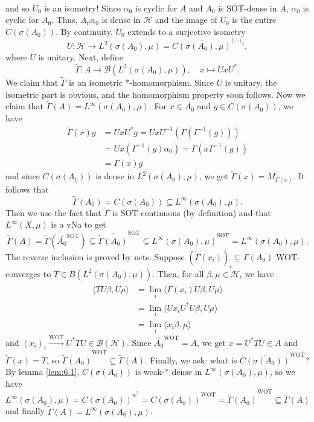 \begin{myproof}
\begin{align*}
  \end{align*}
  and so $U_0$ is an isometry! Since $\alpha_0$ is cyclic for $A$ and $A_0$ is SOT-dense in $A$, $\alpha_0$ is cyclic for $A_0$. Thus, $A_0 \alpha_0$ is dense in $\mathcal{H}$ and the image of $U_0$ is the entire $C(\sigma(A_0))$. By continuity, $U_0$ extends to a surjective isometry 
  $$ U : \mathcal{H} \to L^2 (\sigma(A_0), \mu) = \overline{C(\sigma(A_0), \mu)}^{\langle \cdot, \cdot \rangle_2}, $$
  where $U$ is unitary. Next, define 
  $$ \widetilde{\Gamma} : A \to \mathcal{B} (L^2 (\sigma(A_0), \mu)), \quad x \mapsto UxU^*. $$
  We claim that $\widetilde{\Gamma}$ is an isometric $*$-homomorphism. Since $U$ is unitary, the isometric part is obvious, and the homomorphism property soon follows.
  Now we claim that $\widetilde{\Gamma} (A) = L^\infty (\sigma(A_0), \mu)$. For $x \in A_0$ and $g \in C(\sigma(A_0))$, we have 
  \begin{align*}
    \widetilde{\Gamma} (x) g &= UxU^* g = U x U^{-1} (\Gamma (\Gamma^{-1} (g))) \\
    &= U x (\Gamma^{-1} (g)\alpha_0)= \Gamma (x \Gamma^{-1} (g)) \\ 
    &= \Gamma(x) g 
  \end{align*}
  and since $C(\sigma (A_0))$ is dense in $L^2 (\sigma(A_0), \mu)$, we get $\widetilde{\Gamma}(x) = M_{\Gamma(x)}$. It follows that 
  $$ \widetilde{\Gamma} (A_0) = C(\sigma (A_0)) \subseteq L^\infty (\sigma(A_0), \mu). $$
  Then we use the fact that $\widetilde{\Gamma}$ is SOT-continuous (by definition) and that $L^\infty (X, \mu)$ is a vNa to get
  $$ \widetilde{\Gamma} (A) = \widetilde{\Gamma} (\overline{A_0}^{\mathrm{SOT}}) \subseteq \overline{\widetilde{\Gamma} (A_0)}^{\mathrm{SOT}} \subseteq \overline{L^\infty (\sigma(A_0), \mu)}^{\mathrm{SOT}} = L^\infty (\sigma(A_0), \mu). $$
  The reverse inclusion is proved by nets. Suppose $(\widetilde{\Gamma} (x_i))_i \subseteq \widetilde{\Gamma} (A_0)$ WOT-converges to $T \in B(L^2 (\sigma(A_0), \mu))$. Then, for all $\beta, \mu \in \mathcal{H}$, we have 
  \begin{align*}
    \langle TU \beta, U\mu\rangle &= \lim_{i} \langle \widetilde{\Gamma} (x_i) U\beta, U\mu\rangle \\
    &= \lim_i \langle Ux_i U^* U \beta, U\mu \rangle \\
    &= \lim_i \langle x_i \beta, \mu \rangle
  \end{align*} 
  and $(x_i)_i \xrightarrow{\mathrm{WOT}} U^* T U \in \mathcal{B}(\mathcal{H})$. Since $\overline{A_0}^{\mathrm{WOT}} = A$, we get $x = U^* T U \in A$ and $\widetilde{\Gamma}(x) = T$, so $\overline{\widetilde{\Gamma} (A_0)}^{\mathrm{WOT}} \subseteq \widetilde{\Gamma} (A)$.
  Finally, we ask: what is $\overline{C(\sigma(A_0))}^{\mathrm{WOT}}$? 
  By lemma \ref{lem:6.1}, $C(\sigma(A_0))$ is weak-$*$ dense in $L^\infty (\sigma(A_0), \mu)$, so 
  we have 
  $$ L^\infty (\sigma(A_0), \mu) = \overline{C(\sigma(A_0))}^{w^*} = \overline{C(\sigma(A_0))}^{\mathrm{WOT}} = \overline{\widetilde{\Gamma} (A_0)}^{\mathrm{WOT}} \subseteq \widetilde{\Gamma} (A) $$
  and finally $\widetilde{\Gamma} (A) = L^\infty (\sigma(A_0), \mu)$.
\end{myproof}

